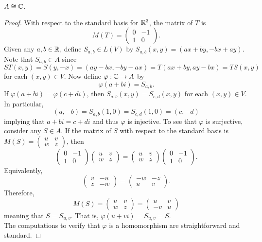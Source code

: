 \documentclass[../AlgebraQualSolutions.tex]{subfiles}
\begin{document}
\begin{claim}
    $A \cong \mathbb{C}$.
    
    \begin{proof}
        With respect to the standard basis for $\mathbb{R}^2$, the matrix of $T$ is
            \[M(T) = \begin{pmatrix} 0 & -1 \\ 1 & 0\end{pmatrix}.\]
        Given any $a,b \in \mathbb{R}$, define $S_{a,b} \in L(V)$ by $S_{a,b}(x,y) = (ax+by,-bx+ay)$. Note that $S_{a,b} \in A$ since
            \[ST(x,y) = S(y,-x) = (ay-bx, -by -ax) = T(ax+by, ay-bx) = TS(x,y)\]
        for each $(x,y) \in V$. Now define $\varphi: \mathbb{C} \to A$ by 
            \[\varphi(a+bi) = S_{a,b}.\]
        If $\varphi(a+bi) = \varphi(c+di)$, then $S_{a,b}(x,y) = S_{c,d}(x,y)$ for each $(x,y) \in V$. In particular,
            \[(a,-b) = S_{a,b}(1,0) = S_{c,d}(1,0) = (c,-d)\]
        implying that $a+bi=c+di$ and thus $\varphi$ is injective. To see that $\varphi$ is surjective, consider any $S \in A$. If the matrix of $S$ with respect to the standard basis is $M(S) = \begin{pmatrix} u & v \\ w & z\end{pmatrix}$, then
            \[\begin{pmatrix} 0 & -1 \\ 1 & 0\end{pmatrix}\begin{pmatrix} u & v \\ w & z\end{pmatrix} = \begin{pmatrix} u & v \\ w & z\end{pmatrix}\begin{pmatrix} 0 & -1 \\ 1 & 0\end{pmatrix}.\]
        Equivalently,
            \[\begin{pmatrix} v & -u \\ z & -w\end{pmatrix} = \begin{pmatrix} -w & -z \\ u & v\end{pmatrix}.\]
        Therefore,
            \[M(S) = \begin{pmatrix} u & v \\ w & z\end{pmatrix} = \begin{pmatrix} u & v \\ -v & u\end{pmatrix}\]
        meaning that $S = S_{u,v}$. That is, $\varphi(u +vi) = S_{u,v} = S$.\\

        The computations to verify that $\varphi$ is a homomorphism are straightforward and standard.
    \end{proof}
\end{claim}
\end{document}
